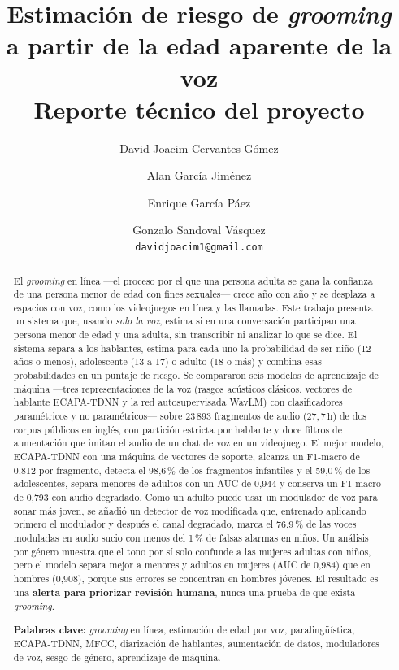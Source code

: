 \documentclass[11pt,a4paper]{article}
\title{\textbf{Estimación de riesgo de \emph{grooming}\\a partir de la edad aparente de la voz}\\[4pt]
\large Reporte técnico del proyecto}
\author{David Joacim Cervantes Gómez \and Alan García Jiménez \and Enrique García Páez \and Gonzalo Sandoval Vásquez\\[6pt]
\small\texttt{davidjoacim1@gmail.com}}
\date{}
\newcommand{\gr}{\emph{grooming}}
\begin{document}
\maketitle

\begin{abstract}
El \gr{} en línea ---el proceso por el que una persona adulta se gana la confianza de una persona menor de edad con fines sexuales--- crece año con año y se desplaza a espacios con voz, como los videojuegos en línea y las llamadas. Este trabajo presenta un sistema que, usando \emph{solo la voz}, estima si en una conversación participan una persona menor de edad y una adulta, sin transcribir ni analizar lo que se dice. El sistema separa a los hablantes, estima para cada uno la probabilidad de ser niño (12 años o menos), adolescente (13 a 17) o adulto (18 o más) y combina esas probabilidades en un puntaje de riesgo. Se compararon seis modelos de aprendizaje de máquina ---tres representaciones de la voz (rasgos acústicos clásicos, vectores de hablante ECAPA-TDNN y la red autosupervisada WavLM) con clasificadores paramétricos y no paramétricos--- sobre 23\,893 fragmentos de audio ($27{,}7\,\mathrm{h}$) de dos corpus públicos en inglés, con partición estricta por hablante y doce filtros de aumentación que imitan el audio de un chat de voz en un videojuego. El mejor modelo, ECAPA-TDNN con una máquina de vectores de soporte, alcanza un F1-macro de 0,812 por fragmento, detecta el 98,6\,\% de los fragmentos infantiles y el 59,0\,\% de los adolescentes, separa menores de adultos con un AUC de 0,944 y conserva un F1-macro de 0,793 con audio degradado. Como un adulto puede usar un modulador de voz para sonar más joven, se añadió un detector de voz modificada que, entrenado aplicando primero el modulador y después el canal degradado, marca el 76,9\,\% de las voces moduladas en audio sucio con menos del 1\,\% de falsas alarmas en niños. Un análisis por género muestra que el tono por sí solo confunde a las mujeres adultas con niños, pero el modelo separa mejor a menores y adultos en mujeres (AUC de 0,984) que en hombres (0,908), porque sus errores se concentran en hombres jóvenes. El resultado es una \textbf{alerta para priorizar revisión humana}, nunca una prueba de que exista \gr{}.

\medskip
\noindent\textbf{Palabras clave:} \gr{} en línea, estimación de edad por voz, paralingüística, ECAPA-TDNN, MFCC, diarización de hablantes, aumentación de datos, moduladores de voz, sesgo de género, aprendizaje de máquina.
\end{abstract}
\end{document}
